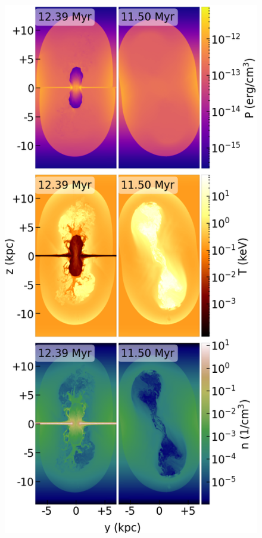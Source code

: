 \documentclass[twocolumn]{aastex631}
\begin{document}
  \begin{figure}
    \includegraphics[width=\columnwidth]{figures/fig__jetI5+ismSeed3-45deg_no-disk-stratified-ambient-Pres-Dens-Temp.png}

\end{figure}
\end{document}
